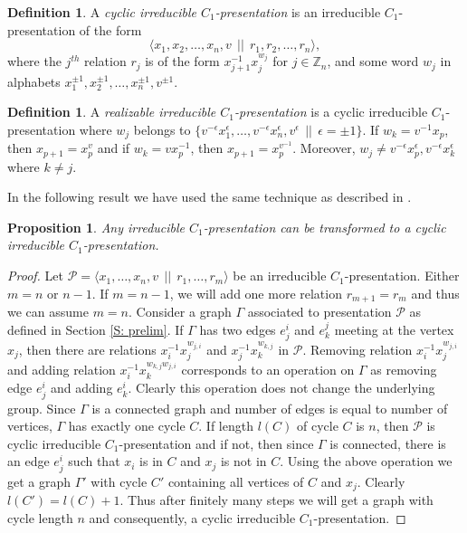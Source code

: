 \documentclass[11 pt, reqno]{amsart}
\newtheorem{proposition}[theorem]{Proposition}
\theoremstyle{definition}
\newtheorem{definition}[theorem]{Definition}
\numberwithin{equation}{subsection}
\begin{document}
\begin{definition}\label{cyclic irreducible $C_1$-presentation}
A \textit{cyclic irreducible $C_1$-presentation} is an irreducible $C_1$-presentation of the form
$$
\langle x_1, x_2, \ldots, x_n,v~~||~~r_1, r_2, \ldots , r_n \rangle,
$$
where the $j^{th}$ relation $r_j$ is of the form $x_{j+1} ^{-1} x_j ^{w_j}$ for $j \in \mathbb{Z}_n$, and some word $w_j$ in alphabets $x_1^{\pm 1}, x_2^{\pm 1}, \ldots , x_n^{\pm 1}, v^{\pm 1}$.
\end{definition}

\begin{definition}\label{realizable irreducible $C_1$-presentation}
A \textit{realizable irreducible $C_1$-presentation} is a cyclic irreducible $C_1$-presentation where $w_j$ belongs to $\{ v^{-\epsilon}x_1^{\epsilon}, \ldots, v^{-\epsilon}x_n^{\epsilon}, v^{\epsilon}~~||~~\epsilon=\pm 1 \}$. If $w_k=v^{-1}x_p$, then $x_{p+1}=x_p^{v}$ and if $w_k=vx_p^{-1}$, then $x_{p+1}=x_p^{v^{-1}}$. Moreover, $w_j \neq v^{-\epsilon} x_p^{\epsilon}, v^{-\epsilon} x_k^{\epsilon}$ where $k \neq j$.

\end{definition}

In the following result we have used the same technique as described in \cite[Lemma 2]{Kim-1}.

\begin{proposition}\label{irreducible $C_1$-presentation-to-cyclic irreducible $C_1$-presentation}
Any irreducible $C_1$-presentation can be transformed to a cyclic irreducible $C_1$-presentation.
\end{proposition}
\begin{proof}
Let $\mathcal{P}= \langle x_1, \ldots, x_n,v ~~||~~r_1, \ldots, r_m \rangle$ be an irreducible $C_1$-presentation. Either $m=n$ or $n-1$. If $m=n-1$, we will add one more relation $r_{m+1}=r_m$ and thus we can assume $m=n$. Consider a graph $\Gamma$ associated to presentation $\mathcal{P}$ as defined in Section \ref{S: prelim}. If $\Gamma$ has two edges $e_j^i$ and $e_k^j$ meeting at the vertex $x_j$, then there are relations $x_i^{-1}x_j^{w_{j,i}}$ and $x_j^{-1} x_k^{w_{k,j}}$ in $\mathcal{P}$. Removing relation $x_i^{-1}x_j^{w_{j,i}}$ and adding relation $x_i^{-1}x_k^{w_{k,j}w_{j,i}}$ corresponds to an operation on $\Gamma$ as removing edge $e_j^i$ and adding $e_k^i$. Clearly this operation does not change the underlying group. Since $\Gamma$ is a connected graph and number of edges is equal to number of vertices, $\Gamma$ has exactly one cycle $C$. If length $l(C)$ of cycle $C$ is $n$, then $\mathcal{P}$ is cyclic irreducible $C_1$-presentation and if not, then since $\Gamma$ is connected, there is an edge $e_j ^i$ such that $x_i$ is in $C$ and $x_j$ is not in $C$. Using the above operation we get a graph $\Gamma '$ with cycle $C'$ containing all vertices of $C$ and $x_j$. Clearly $l(C')=l(C)+1$. Thus after finitely many steps we will get a graph with cycle length $n$ and consequently, a cyclic irreducible $C_1$-presentation.
\end{proof}
\end{document}
